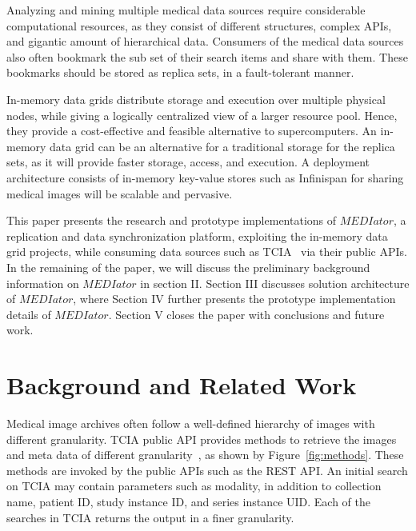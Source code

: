 \documentclass[letterpaper, 10 pt, conference]{ieeeconf}  %
\begin{document}
Analyzing and mining multiple medical data sources require considerable computational resources, as they consist of different structures, complex APIs, and gigantic amount of hierarchical data. Consumers of the medical data sources also often bookmark the sub set of their search items and share with them. These bookmarks should be stored as replica sets, in a fault-tolerant manner. 
 
In-memory data grids distribute storage and execution over multiple physical nodes, while giving a logically centralized view of a larger resource pool. Hence, they provide a cost-effective and feasible alternative to supercomputers. An in-memory data grid can be an alternative for a traditional storage for the replica sets, as it will provide faster storage, access, and execution. A deployment architecture consists of in-memory key-value stores such as Infinispan for sharing medical images will be scalable and pervasive.

This paper presents the research and prototype implementations of $MEDIator$, a replication and data synchronization platform, exploiting the in-memory data grid projects, while consuming data sources such as TCIA~\cite{prior2013tcia} via their public APIs. In the remaining of the paper, we will discuss the preliminary background information on $MEDIator$ in section II. Section III discusses solution architecture of $MEDIator$, where Section IV further presents the prototype implementation details of $MEDIator$. Section V closes the paper with conclusions and future work.

%
\section{Background and Related Work}

Medical image archives often follow a well-defined hierarchy of images with different granularity. TCIA public API provides methods to retrieve the images and meta data of different granularity~\cite{prior2013tcia}, as shown by Figure~\ref{fig:methods}. These methods are invoked by the public APIs such as the REST API. An initial search on TCIA may contain parameters such as modality, in addition to collection name, patient ID, study instance ID, and series instance UID. Each of the searches in TCIA returns the output in a finer granularity.
\end{document}
